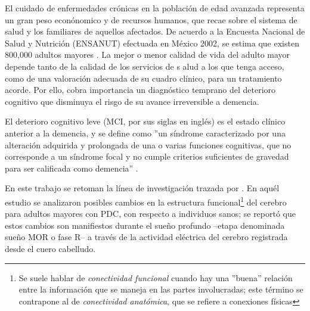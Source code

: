 %

El cuidado de enfermedades cr\'onicas en la poblaci\'on de edad avanzada representa un gran peso 
econ\'onomico y de recursos humanos, que recae sobre el sistema de salud y los familiares de 
aquellos afectados. 
De acuerdo a la Encuesta Nacional de Salud y Nutrici\'on (ENSANUT) efectuada en M\'exico 2002, se 
estima que existen 800,000 adultos mayores \cite{Sosa12}. 
La mejor o menor calidad de vida del adulto mayor depende tanto de la calidad de los servicios de s
alud a los que tenga acceso, como de una valoraci\'on adecuada de su cuadro cl\'inico, para un 
tratamiento acorde. Por ello, cobra importancia un diagn\'ostico temprano del deterioro cognitivo 
que disminuya el risgo de su avance irreversible a demencia.

El deterioro cognitivo leve (MCI, por sus siglas en ingl\'es) es el estado cl\'inico anterior a la
demencia, y se define como ''un s\'indrome caracterizado por una alteraci\'on adquirida y 
prolongada de una o varias funciones cognitivas, que no corresponde a un s\'indrome focal y no 
cumple criterios suficientes de gravedad para ser calificada como demencia'' \cite{Robles02}.

En este trabajo se retoman %
la l\'inea de investigaci\'on trazada por \cite{VazquezTagle16}.
En aqu\'el estudio se analizaron
posibles cambios en la estructura funcional\footnote{Se suele hablar de 
\textit{conectividad funcional} cuando hay una ''buena'' relaci\'on entre la informaci\'on
que se maneja en las partes involucradas; este t\'ermino se contrapone al de
\textit{conectividad anat\'omica}, que se refiere a conexiones f\'isicas}
del cerebro para adultos mayores con PDC, con 
respecto a individuos sanos; se report\'o que estos cambios son manifiestos durante el sue\~no
profundo --etapa denominada sue\~no MOR o fase R-- 
a trav\'es de la actividad el\'ectrica del cerebro registrada desde el cuero 
cabelludo. 

